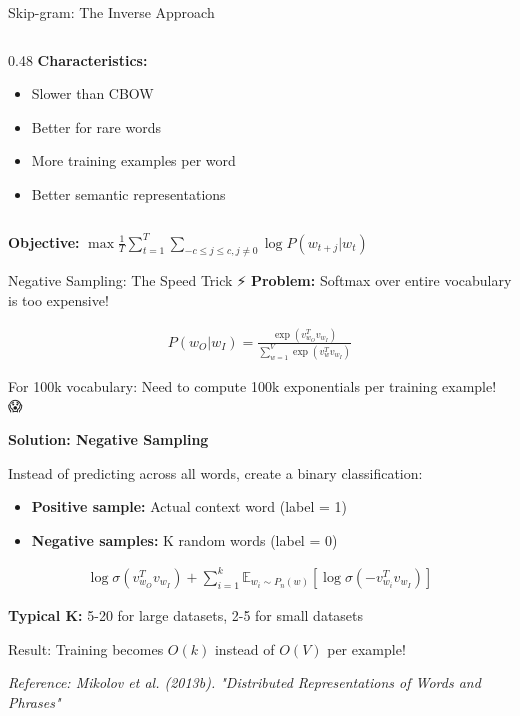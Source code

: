 \documentclass[aspectratio=169]{beamer}
\begin{document}
\begin{frame}[shrink=10]{Skip-gram: The Inverse Approach 🔄}
\begin{columns}[T]
\begin{column}{0.48\textwidth}
\vspace{0.5em}
\textbf{Characteristics:}
\begin{itemize}\setlength{\itemsep}{0pt}
    \item \alert{Slower} than CBOW
    \item Better for rare words
    \item More training examples per word
    \item Better semantic representations
\end{itemize}
\end{column}
\end{columns}

\vspace{0.5em}
\textbf{Objective:} $\max \frac{1}{T}\sum_{t=1}^T \sum_{-c \leq j \leq c, j \neq 0} \log P(w_{t+j} | w_t)$
\end{frame}

\begin{frame}{Negative Sampling: The Speed Trick ⚡}
\textbf{Problem:} Softmax over entire vocabulary is too expensive!

\begin{align*}
P(w_O|w_I) = \frac{\exp(v_{w_O}^T v_{w_I})}{\sum_{w=1}^V \exp(v_w^T v_{w_I})}
\end{align*}

\vspace{0.5em}
For 100k vocabulary: Need to compute 100k exponentials per training example! 😱

\pause
\vspace{1em}

\textbf{Solution: Negative Sampling}

Instead of predicting across all words, create a binary classification:
\begin{itemize}\setlength{\itemsep}{0pt}
    \item \textbf{Positive sample:} Actual context word (label = 1)
    \item \textbf{Negative samples:} K random words (label = 0)
\end{itemize}

\vspace{0.5em}

\begin{align*}
\log \sigma(v_{w_O}^T v_{w_I}) + \sum_{i=1}^k \mathbb{E}_{w_i \sim P_n(w)} [\log \sigma(-v_{w_i}^T v_{w_I})]
\end{align*}

\vspace{0.5em}
\textbf{Typical K:} 5-20 for large datasets, 2-5 for small datasets

\vspace{0.5em}
\alert{Result:} Training becomes $O(k)$ instead of $O(V)$ per example!

\small
\textit{Reference: Mikolov et al. (2013b). "Distributed Representations of Words and Phrases"}
\end{frame}
\end{document}
